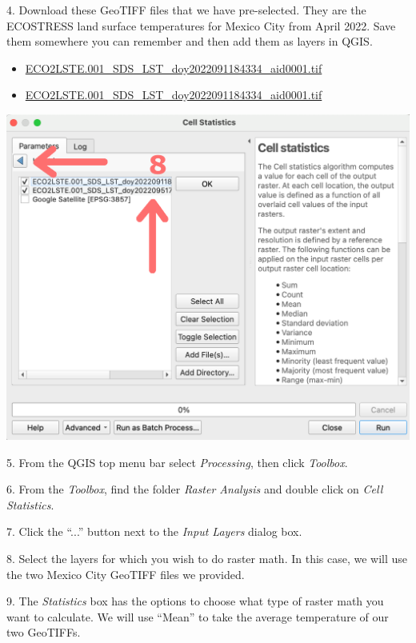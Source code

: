 \documentclass[oneside,a4paper,11pt,explicit]{book}
\begin{document}
\vspace{.5em}

4. Download these GeoTIFF files that we have pre-selected. They are the ECOSTRESS land surface temperatures for Mexico City from April 2022. Save them somewhere you can remember and then add them as layers in QGIS. 

\begin{itemize}
    \item \href{https://jeremydforsythe.github.io/icecream-tutorials/Tutorial10_RasterCalculator/ECO2LSTE.001_SDS_LST_doy2022091184334_aid0001.tif}{\small ECO2LSTE.001\_SDS\_LST\_doy2022091184334\_aid0001.tif}
    \item \href{https://jeremydforsythe.github.io/icecream-tutorials/Tutorial10_RasterCalculator/ECO2LSTE.001_SDS_LST_doy2022091184334_aid0001.tif}{\small ECO2LSTE.001\_SDS\_LST\_doy2022091184334\_aid0001.tif}
\end{itemize}

\vspace{.5em}

\centerline{\includegraphics[width=.6\textwidth]{CellSelect.png}}

\vspace{.5em}

5. From the QGIS top menu bar select \textit{Processing}, then click \textit{Toolbox}.

6. From the \textit{Toolbox}, find the folder \textit{Raster Analysis} and double click on \textit{Cell Statistics}.

7. Click the ``...'' button next to the \textit{Input Layers} dialog box. 

8. Select the layers for which you wish to do raster math. In this case, we will use the two Mexico City GeoTIFF files we provided.

9. The \textit{Statistics} box has the options to choose what type of raster math you want to calculate. We will use ``Mean'' to take the average temperature of our two GeoTIFFs. 
\end{document}

